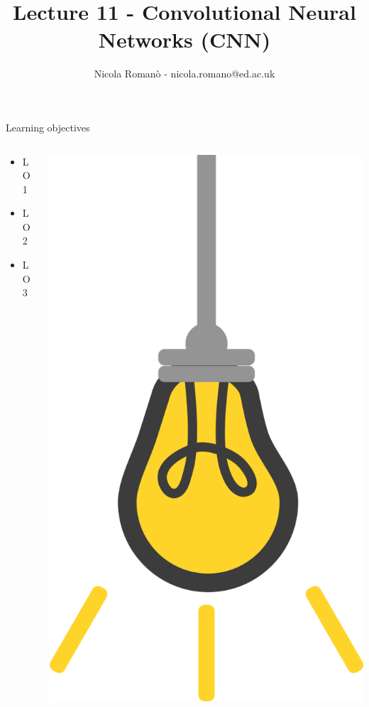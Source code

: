 \documentclass[9pt, aspectratio=169]{beamer}
\author{Nicola Roman\`o - nicola.romano@ed.ac.uk}
\title{Lecture 11 - Convolutional Neural Networks (CNN)}
\date{}
\begin{document}

\begin{frame}
    \titlepage
\end{frame}

\begin{frame}
    {Learning objectives}
    \begin{columns}
        \begin{column}{0.8\textwidth}
            \begin{itemize}
                \item LO 1
                \item LO 2
                \item LO 3
            \end{itemize}
        \end{column}
        \begin{column}{0.2\textwidth}
            \includegraphics[angle=-30, origin=tr, width=1.5\textwidth]{lightbulb.png}

\end{column}
\end{columns}
\end{frame}
\end{document}
